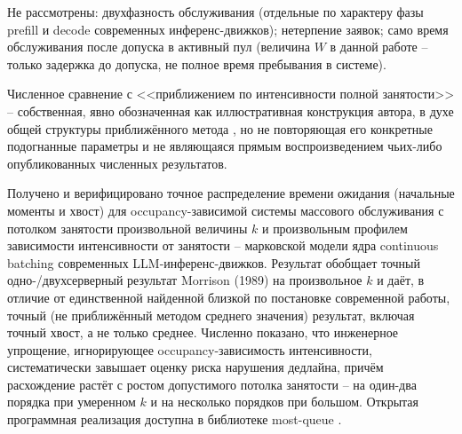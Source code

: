 \documentclass[12pt,a4paper]{article}
\newcommand{\articlesection}[1]{\par\vspace{14pt}{\bfseries #1}\par\vspace{6pt}\nopagebreak}
\begin{document}
Не рассмотрены: двухфазность обслуживания (отдельные по характеру фазы prefill и decode современных инференс-движков); нетерпение заявок; само время обслуживания после допуска в активный пул (величина $W$ в данной работе -- только задержка до допуска, не полное время пребывания в системе).

Численное сравнение с <<приближением по интенсивности полной занятости>> -- собственная, явно обозначенная как иллюстративная конструкция автора, в духе общей структуры приближённого метода \cite{ramani2026}, но не повторяющая его конкретные подогнанные параметры и не являющаяся прямым воспроизведением чьих-либо опубликованных численных результатов.

\articlesection{Заключение}

Получено и верифицировано точное распределение времени ожидания (начальные моменты и хвост) для occupancy-зависимой системы массового обслуживания с потолком занятости произвольной величины $k$ и произвольным профилем зависимости интенсивности от занятости -- марковской модели ядра continuous batching современных LLM-инференс-движков. Результат обобщает точный одно-/двухсерверный результат Morrison (1989) на произвольное $k$ и даёт, в отличие от единственной найденной близкой по постановке современной работы, точный (не приближённый методом среднего значения) результат, включая точный хвост, а не только среднее. Численно показано, что инженерное упрощение, игнорирующее occupancy-зависимость интенсивности, систематически завышает оценку риска нарушения дедлайна, причём расхождение растёт с ростом допустимого потолка занятости -- на один-два порядка при умеренном $k$ и на несколько порядков при большом. Открытая программная реализация доступна в библиотеке most-queue \cite{mostqueue2026}.

\articlesection{Список литературы}
\printbibliography[heading=none]
\end{document}
